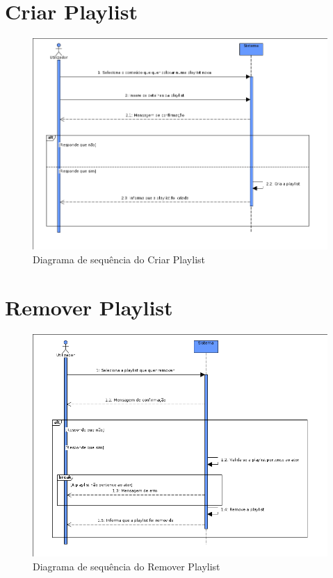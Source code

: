 \documentclass[a4paper]{report}
\begin{document}
\section{Criar Playlist}
\begin{figure}[H]
	\centering 
    \includegraphics[width=\textwidth]{images/criarplaylistSeq.png}  
    \caption{Diagrama de sequência do Criar Playlist}
\end{figure}

\section{Remover Playlist}
\begin{figure}[H]
	\centering 
    \includegraphics[width=\textwidth]{images/remplaylistSeq.png}  
    \caption{Diagrama de sequência do Remover Playlist}
\end{figure}
\end{document}
